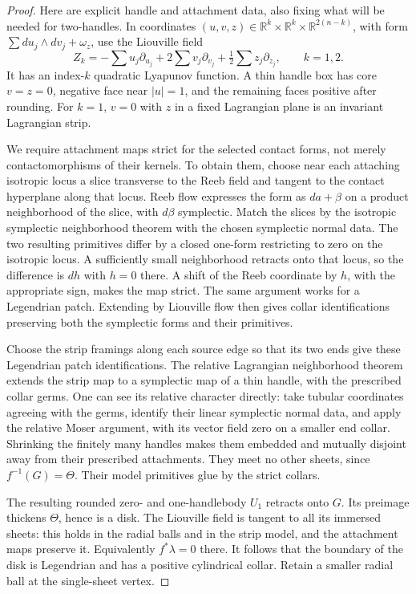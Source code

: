 \documentclass[11pt]{article}
\numberwithin{equation}{section}
\theoremstyle{definition}
\theoremstyle{remark}
\newcommand{\R}{\mathbb R}
\begin{document}
\begin{proof}
Here are explicit handle and attachment data, also fixing what
will be needed for two-handles.  In coordinates
$(u,v,z)\in\R^k\times\R^k\times\R^{2(n-k)}$, with form
$\sum du_j\wedge dv_j+\omega_z$, use the Liouville field
\begin{equation}\label{top:eq:handle-model}
       Z_k=-\sum u_j\partial_{u_j}
                    +2\sum v_j\partial_{v_j}
                    +\tfrac12\sum z_j\partial_{z_j},\qquad k=1,2.
\end{equation}
It has an index-$k$ quadratic Lyapunov function.  A thin handle box
has core $v=z=0$, negative face near $|u|=1$, and the remaining
faces positive after rounding.  For $k=1$, $v=0$ with $z$ in a
fixed Lagrangian plane is an invariant Lagrangian strip.

We require attachment maps strict for the selected contact forms,
not merely contactomorphisms of their kernels.  To obtain them,
choose near each attaching isotropic locus a slice transverse to
the Reeb field and tangent to the contact hyperplane along that
locus.  Reeb flow expresses the form as $da+\beta$ on a product
neighborhood of the slice, with $d\beta$ symplectic.  Match the
slices by the isotropic symplectic neighborhood theorem with the
chosen symplectic normal data.  The two resulting primitives differ
by a closed one-form restricting to zero on the isotropic locus.
A sufficiently small neighborhood retracts onto that locus, so
the difference is $dh$ with $h=0$ there.  A shift of the Reeb
coordinate by $h$, with the appropriate sign, makes the map
strict.  The same argument works for a Legendrian patch.
Extending by Liouville flow then gives collar identifications
preserving both the symplectic forms and their primitives.

Choose the strip framings along each source edge so that its two
ends give these Legendrian patch identifications.  The relative
Lagrangian neighborhood theorem extends the strip map to a
symplectic map of a thin handle, with the prescribed collar germs.
One can see its relative character directly: take tubular
coordinates agreeing with the germs, identify their linear
symplectic normal data, and apply the relative Moser argument,
with its vector field zero on a smaller end collar.  Shrinking
the finitely many handles makes them embedded and mutually
disjoint away from their prescribed attachments.  They meet no
other sheets, since $f^{-1}(G)=\Theta$.  Their model primitives
glue by the strict collars.

The resulting rounded zero- and one-handlebody $U_1$ retracts onto
$G$.  Its preimage thickens $\Theta$, hence is a disk.  The
Liouville field is tangent to all its immersed sheets: this holds
in the radial balls and in the strip model, and the attachment
maps preserve it.  Equivalently $f^*\lambda=0$ there.  It follows
that the boundary of the disk is Legendrian and has a positive
cylindrical collar.  Retain a smaller radial ball at the
single-sheet vertex.


\end{proof}
\end{document}
